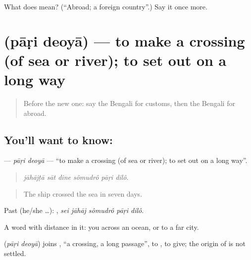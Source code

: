 \begin{tcolorbox}[breakable,colback=teal!4,colframe=teal!35!black,title={Before you move on}]
What does  mean? (\textquotedblleft{}Abroad; a foreign country\textquotedblright{}.) Say it once more.
\end{tcolorbox}
\section[\texorpdfstring{\bn{পাড়ি} \bn{দেওয়া} (pāṛi deoyā)}{পাড়ি দেওয়া (pāṛi deoyā)}]{  (pāṛi deoyā) — to make a crossing (of sea or river); to set out on a long way}

\label{lesson:BN-C395-pari-deoya}



\begin{quote}
Before the new one: say the Bengali for customs, then the Bengali for abroad.
\end{quote}

\subsection*{You'll want to know:  }
\textbf{ } — \emph{pāṛi deoyā} — \textquotedblleft{}to make a crossing (of sea or river); to set out on a long way\textquotedblright{}.

\begin{quote}
     
\end{quote}

\begin{quote}
\emph{jāhājṭā sāt dine sômudrô pāṛi dilô.}
\end{quote}

\begin{quote}
The ship crossed the sea in seven days.
\end{quote}

Past (he/she …):     , \emph{sei jāhāj sômudrô pāṛi dilô}.

A word with distance in it: you   across an ocean, or to a far city.

\begin{cousinweb}
\textbf{ } (\emph{pāṛi deoyā}) joins , \textquotedblleft{}a crossing, a long passage\textquotedblright{}, to , to give; the origin of  is not settled.
\end{cousinweb}

